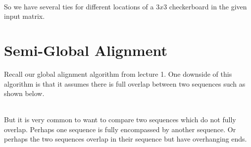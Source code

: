 \documentclass[11pt]{article}
\begin{document}
\noindent
{} \\
\noindent
So we have several ties for different locations of a $3x3$ checkerboard in the given input matrix.

\section{Semi-Global Alignment}
\noindent
Recall our global alignment algorithm from lecture 1. One downside of this algorithm is that it assumes there is full overlap between two sequences such as shown below. \\

 \\

But it is very common to want to compare two sequences which do not fully overlap. Perhaps one sequence is fully encompassed by another sequence. Or perhaps the two sequences overlap in their sequence but have overhanging ends. \\
\end{document}
